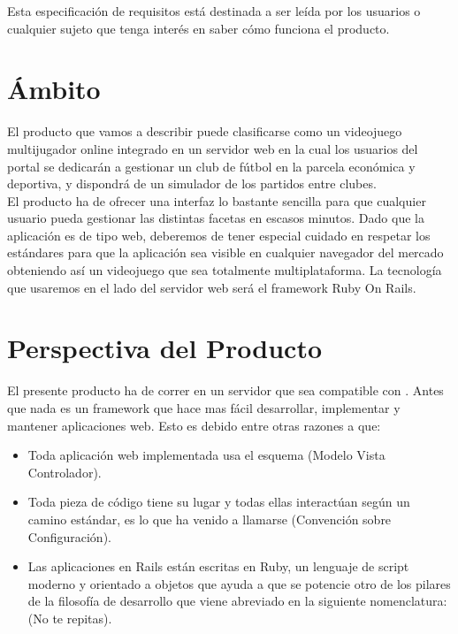 Esta especificación de requisitos está destinada a ser leída por los usuarios o
cualquier sujeto que tenga interés en saber cómo funciona el producto.

\section{Ámbito}
El producto que vamos a describir puede clasificarse como un videojuego
multijugador online integrado en un servidor web en la cual los usuarios del
portal se dedicarán a gestionar un club de fútbol en la parcela económica y
deportiva, y dispondrá de un simulador de los
partidos entre clubes.\\

El producto ha de ofrecer una interfaz lo bastante sencilla para que cualquier
usuario pueda gestionar las distintas facetas en escasos minutos. Dado que la
aplicación es de tipo web, deberemos de tener especial cuidado en respetar los
estándares para que la aplicación sea visible en cualquier navegador del mercado
obteniendo así un videojuego que sea totalmente multiplataforma. La tecnología
que usaremos en el lado del servidor web será el framework Ruby On Rails.

\section{Perspectiva del Producto}
El presente producto ha de correr en un servidor que sea compatible con
. Antes que nada  es un
framework que hace mas fácil desarrollar, implementar y mantener aplicaciones
web. Esto es debido entre otras razones a que:

\begin{itemize}
\item Toda aplicación web implementada usa el esquema  (Modelo Vista
  Controlador).
  
\item Toda pieza de código tiene su lugar y todas ellas interactúan según un
  camino estándar, es lo que ha venido a llamarse  (Convención sobre
  Configuración).
  
\item Las aplicaciones en Rails están escritas en Ruby, un lenguaje de script
  moderno y orientado a objetos que ayuda a que se potencie otro de los pilares
  de la filosofía de desarrollo que viene abreviado en la siguiente
  nomenclatura:  (No te repitas).
\end{itemize}


